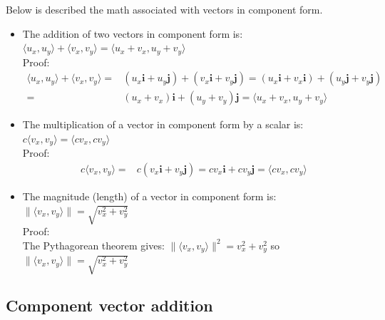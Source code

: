 \documentclass{article}
\begin{document}
Below is described the math associated with vectors in component form.
\begin{itemize}
\item The addition of two vectors in component form is: \(\langle u_x, u_y \rangle + \langle v_x, v_y \rangle = \langle u_x + v_x, u_y + v_y \rangle\) \\
Proof:
\begin{align*}
\langle u_x, u_y \rangle + \langle v_x, v_y \rangle = & (u_x\mathbf{i} + u_y\mathbf{j}) + (v_x\mathbf{i} + v_y\mathbf{j}) 
= (u_x\mathbf{i} + v_x\mathbf{i}) + (u_y\mathbf{j} + v_y\mathbf{j}) \\
= & (u_x + v_x)\mathbf{i} + (u_y + v_y)\mathbf{j} 
= \langle u_x + v_x , u_y + v_y \rangle 
\end{align*}
\item The multiplication of a vector in component form by a scalar is: \(c\langle v_x, v_y \rangle = \langle c v_x, c v_y \rangle\) \\
Proof:
\begin{align*}
c\langle v_x, v_y \rangle =  & c(v_x\mathbf{i} + v_y\mathbf{j})
= cv_x\mathbf{i} + cv_y\mathbf{j}
= \langle cv_x, cv_y \rangle
\end{align*}
\item The magnitude (length) of a vector in component form is: \(\|\langle v_x, v_y \rangle\| = \sqrt{v_x^2 + v_y^2}\) \\
Proof: \\
The Pythagorean theorem gives: \(\|\langle v_x, v_y \rangle\|^2 = v_x^2 + v_y^2\) so \(\|\langle v_x, v_y \rangle\| = \sqrt{v_x^2 + v_y^2}\)  
\end{itemize}



\subsection*{Component vector addition}
\end{document}
